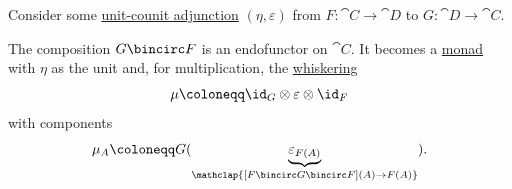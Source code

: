\begin{definition}\label{def:adjunction_monad}
  Consider some \hyperref[def:unit_counit_adjunction]{unit-counit adjunction} \( (\eta, \varepsilon) \) from \( {F: \cat{C} \to \cat{D}} \) to \( {G: \cat{D} \to \cat{C}} \).

  The composition \( G \bincirc F \) is an endofunctor on \( \cat{C} \). It becomes a \hyperref[def:monad]{monad} with \( \eta \) as the unit and, for multiplication, the \hyperref[def:natural_transformation_whiskering]{whiskering}
  \begin{equation*}
    \mu \coloneqq \id_G \otimes \varepsilon \otimes \id_F
  \end{equation*}
  with components
  \begin{equation*}
    \mu_A \coloneqq G(\underbrace{\varepsilon_{F(A)}}_{\mathclap{[F \bincirc G \bincirc F](A) \to F(A)}}).
  \end{equation*}
\end{definition}
